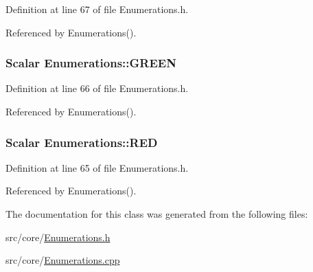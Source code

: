 \-Definition at line 67 of file \-Enumerations.\-h.



\-Referenced by \-Enumerations().

\hypertarget{class_enumerations_a4d0594e227e2d94eab224f35e8947db6}{
\subsubsection[{\-G\-R\-E\-E\-N}]{\setlength{\rightskip}{0pt plus 5cm}\-Scalar {\bf \-Enumerations\-::\-G\-R\-E\-E\-N}}}
\label{class_enumerations_a4d0594e227e2d94eab224f35e8947db6}


\-Definition at line 66 of file \-Enumerations.\-h.



\-Referenced by \-Enumerations().

\hypertarget{class_enumerations_a4a71e14de92dd0252f0ba60755511fa7}{
\subsubsection[{\-R\-E\-D}]{\setlength{\rightskip}{0pt plus 5cm}\-Scalar {\bf \-Enumerations\-::\-R\-E\-D}}}
\label{class_enumerations_a4a71e14de92dd0252f0ba60755511fa7}


\-Definition at line 65 of file \-Enumerations.\-h.



\-Referenced by \-Enumerations().



\-The documentation for this class was generated from the following files\-:\begin{DoxyCompactItemize}
\item 
src/core/\hyperlink{_enumerations_8h}{\-Enumerations.\-h}\item 
src/core/\hyperlink{_enumerations_8cpp}{\-Enumerations.\-cpp}\end{DoxyCompactItemize}

